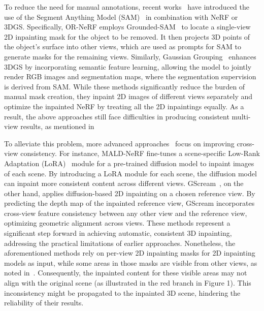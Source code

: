 To reduce the need for manual annotations, recent works~\cite{yin2023ornerf, ye2023gaussiangrouping} have introduced the use of the Segment Anything Model (SAM)~\cite{kirillov2023sam} in combination with NeRF or 3DGS. Specifically, OR-NeRF employs Grounded-SAM~\cite{ren2024grounded} to locate a single-view 2D inpainting mask for the object to be removed. It then projects 3D points of the object's surface into other views, which are used as prompts for SAM to generate masks for the remaining views. 
Similarly, Gaussian Grouping~\cite{ye2023gaussiangrouping} enhances 3DGS by incorporating semantic feature learning, allowing the model to jointly render RGB images and segmentation maps, where the segmentation supervision is derived from SAM. 
While these methods significantly reduce the burden of manual mask creation, they inpaint 2D images of different views separately and optimize the inpainted NeRF by treating all the 2D inpaintings equally. As a result, the above approaches still face difficulties in producing consistent multi-view results, as mentioned in~\cite{lin2024maldnerf, chen2024mvip, wang2024gscream}



To alleviate this problem, more advanced approaches~\cite{chen2024mvip, lin2024maldnerf, wang2024gscream} focus on improving cross-view consistency. For instance, MALD-NeRF fine-tunes a scene-specific Low-Rank Adaptation (LoRA)~\cite{hu2021lora} module for a pre-trained diffusion model to inpaint images of each scene. By introducing a LoRA module for each scene, the diffusion model can inpaint more consistent content across different views. GScream~\cite{wang2024gscream}, on the other hand, applies diffusion-based 2D inpainting on a chosen reference view. By predicting the depth map of the inpainted reference view, GScream incorporates cross-view feature consistency between any other view and the reference view, optimizing geometric alignment across views. These methods represent a significant step forward in achieving automatic, consistent 3D inpainting, addressing the practical limitations of earlier approaches. Nonetheless, the aforementioned methods rely on per-view 2D inpainting masks for 2D inpainting models as input, while some areas in those masks are visible from other views, as noted in~\cite{ye2023gaussiangrouping}. Consequently, the inpainted content for these visible areas may not align with the original scene (as illustrated in the red branch in Figure 1). This inconsistency might be propagated to the inpainted 3D scene, hindering the reliability of their results.